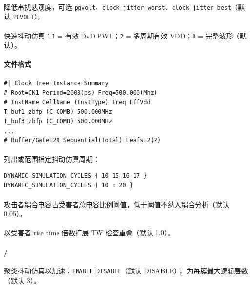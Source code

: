 \paragraph{}
降低串扰悲观度，可选 \texttt{pgvolt}、\texttt{clock\_jitter\_worst}、\texttt{clock\_jitter\_best}（默认 \texttt{PGVOLT}）。

\paragraph{}
快速抖动仿真：\texttt{1} = 有效 DvD PWL；\texttt{2} = 多周期有效 VDD；\texttt{0} = 完整波形（默认）。

\paragraph{ 文件格式}
\begin{lstlisting}
#| Clock Tree Instance Summary
# Root=CK1 Period=2000(ps) Freq=500.000(Mhz)
# InstName CellName (InstType) Freq EffVdd
T_buf1 zbfp (C_COMB) 500.000MHz
T_buf3 zbfp (C_COMB) 500.000MHz
...
# Buffer/Gate=29 Sequential(Total) Leafs=2(2)
\end{lstlisting}

\paragraph{}
列出或范围指定抖动仿真周期：
\begin{lstlisting}
DYNAMIC_SIMULATION_CYCLES { 10 15 16 17 }
DYNAMIC_SIMULATION_CYCLES { 10 : 20 }
\end{lstlisting}

\paragraph{}
攻击者耦合电容占受害者总电容比例阈值，低于阈值不纳入耦合分析（默认 0.05）。

\paragraph{}
以受害者 rise time 倍数扩展 TW 检查重叠（默认 1.0）。

\paragraph{ / }
聚类抖动仿真以加速：\texttt{ENABLE|DISABLE}（默认 DISABLE）； 为每簇最大逻辑层数（默认 3）。

